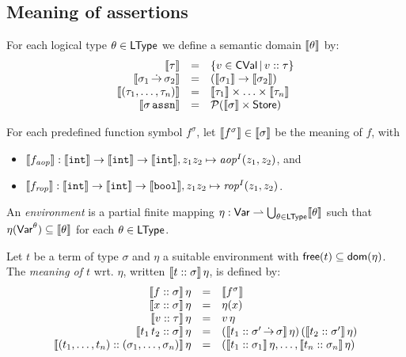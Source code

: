 \documentclass[12pt,a4paper]{article}
\newcommand{\aop}{\nstyle{aop}}
\newcommand{\rop}{\nstyle{rop}}
\newcommand{\CVal}{\sstyle{CVal}}
\begin{document}
\subsection{Meaning of assertions}

For each logical type $\theta\in\mathsf{LType}$ we define a semantic domain $\llbracket\theta\rrbracket$ by:
\[\begin{array}{rcl}
  \semantic{\tau} &=& \{v\in\CVal\,|\,\tj{v}{\tau}\} \\
  \semantic{\ttarrow{\sigma_1}{\sigma_2}} &=& (\semantic{\sigma_1} \to \semantic{\sigma_2}) \\
  \semantic{\ttuple{\tau_1,\ldots,\tau_n}} &=& \semantic{\tau_1} \times \ldots \times \semantic{\tau_n} \\
  \semantic{\tassn[\sigma]} &=& \mathcal{P}(\semantic{\sigma} \times \Store)
\end{array}\]

For each predefined function symbol $f^\sigma$, let $\llbracket f^\sigma\rrbracket\in\llbracket\sigma\rrbracket$ be the meaning of
$f$, with
\begin{itemize}
\item $\semantic{f_\aop} : \semantic{\tint} \to \semantic{\tint} \to \semantic{\tint},
  z_1 z_2 \mapsto \aop^I(z_1,z_2)$, and
\item $\semantic{f_\rop} : \semantic{\tint} \to \semantic{\tint} \to \semantic{\tbool},
  z_1 z_2 \mapsto \rop^I(z_1,z_2)$.
\end{itemize}

An {\em environment} is a partial finite mapping $\eta:\mathsf{Var} \rightharpoonup \bigcup_{\theta\in\mathsf{LType}}\llbracket\theta\rrbracket$ such
that $\eta(\mathsf{Var}^\theta) \subseteq \llbracket\theta\rrbracket$ for each $\theta\in\mathsf{LType}$.

\begin{definition}
  Let $t$ be a term of type $\sigma$ and $\eta$ a suitable environment with $\mathsf{free}(t) \subseteq \mathsf{dom}(\eta)$.
  The {\em meaning of $t$} wrt. $\eta$, written $\llbracket{t}\mathrel{::}{\sigma}\rrbracket\,\eta$, is defined by:
  \[\begin{array}{rcl}
    \llbracket{f}\mathrel{::}{\sigma}\rrbracket\,\eta
    &=& \llbracket f^\sigma\rrbracket \\
    \llbracket{x}\mathrel{::}{\sigma}\rrbracket\,\eta
    &=& \eta(x) \\
    \llbracket{v}\mathrel{::}{\tau}\rrbracket\,\eta
    &=& v\,\eta \\
    \llbracket{t_1\,t_2}\mathrel{::}{\sigma}\rrbracket\,\eta
    &=& (\llbracket{t_1}\mathrel{::}{\sigma'\operatorname{\dot{\to}}\sigma}\rrbracket\,\eta)\,(\llbracket{t_2}\mathrel{::}{\sigma'}\rrbracket\,\eta) \\
    \llbracket{(t_1,\ldots,t_n)}\mathrel{::}{(\sigma_1,\ldots,\sigma_n)}\rrbracket\,\eta
    &=& (\llbracket{t_1}\mathrel{::}{\sigma_1}\rrbracket\,\eta,\ldots,\llbracket{t_n}\mathrel{::}{\sigma_n}\rrbracket\,\eta) 
  \end{array}\]
\end{definition}
\end{document}
